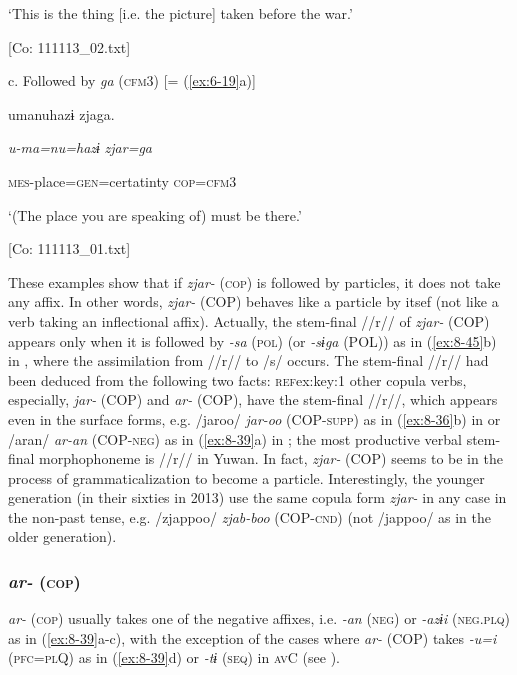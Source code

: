     ‘This is the thing [i.e. the picture] taken before the war.’

    [Co: 111113\_02.txt]
\z

  c. Followed by \textit{ga} (\textsc{cfm}3) [= (\ref{ex:6-19}a)]

  {\TM}
\glll  umanuhazɨ  zjaga.

    \textit{u-ma=nu=hazɨ}  \textit{zjar=ga}

    \textsc{mes}-place=\textsc{gen}=certatinty  \textsc{cop}=\textsc{cfm}3

    ‘(The place you are speaking of) must be there.’

    [Co: 111113\_01.txt]
\z

These examples show that if \textit{zjar-} (\textsc{cop}) is followed by particles, it does not take any affix. In other words, \textit{zjar-} (COP) behaves like a particle by itsef (not like a verb taking an inflectional affix). Actually, the stem-final //r// of \textit{zjar-} (COP) appears only when it is followed by \textit{{}-sa} (\textsc{pol}) (or \textit{{}-sɨga} (POL)) as in (\ref{ex:8-45}b) in , where the assimilation from //r// to /s/ occurs. The stem-final //r// had been deduced from the following two facts: \textsc{ref}{ex:key:1} other copula verbs, especially, \textit{jar-} (COP) and \textit{ar-} (COP), have the stem-final //r//, which appears even in the surface forms, e.g. /jaroo/ \textit{jar-oo} (COP-\textsc{supp}) as in (\ref{ex:8-36}b) in  or /aran/ \textit{ar-an} (COP-\textsc{neg}) as in (\ref{ex:8-39}a) in ;  the most productive verbal stem-final morphophoneme is //r// in Yuwan. In fact, \textit{zjar-} (COP) seems to be in the process of grammaticalization to become a particle. Interestingly, the younger generation (in their sixties in 2013) use the same copula form \textit{zjar-} in any case in the non-past tense, e.g. /zjappoo/ \textit{zjab-boo} (COP-\textsc{cnd}) (not /jappoo/ as in the older generation).

\subsubsection{\textit{ar-} (\textsc{cop})}

\textit{ar-} (\textsc{cop}) usually takes one of the negative affixes, i.e. \textit{{}-an} (\textsc{neg}) or \textit{{}-azɨi} (\textsc{neg}.\textsc{plq}) as in (\ref{ex:8-39}a-c), with the exception of the cases where \textit{ar-} (COP) takes \textit{{}-u=i} (\textsc{pfc}=\textsc{pl}Q) as in (\ref{ex:8-39}d) or \textit{{}-tɨ} (\textsc{seq}) in \textsc{av}C (see ).

